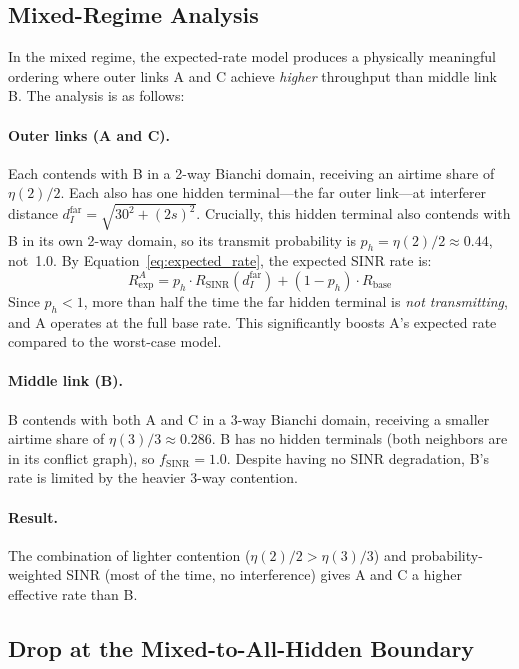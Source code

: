 \documentclass[11pt,a4paper]{article}
\begin{document}
\subsection{Mixed-Regime Analysis}

In the mixed regime, the expected-rate model produces a physically meaningful ordering where outer links A and C achieve \emph{higher} throughput than middle link B. The analysis is as follows:

\paragraph{Outer links (A and C).} Each contends with B in a 2-way Bianchi domain, receiving an airtime share of $\eta(2)/2$. Each also has one hidden terminal---the far outer link---at interferer distance $d_I^{\text{far}} = \sqrt{30^2 + (2s)^2}$. Crucially, this hidden terminal also contends with B in its own 2-way domain, so its transmit probability is $p_h = \eta(2)/2 \approx 0.44$, not~1.0. By Equation~\eqref{eq:expected_rate}, the expected SINR rate is:
\begin{equation}
    R_{\text{exp}}^{A} = p_h \cdot R_{\text{SINR}}(d_I^{\text{far}}) + (1 - p_h) \cdot R_{\text{base}}
\end{equation}
Since $p_h < 1$, more than half the time the far hidden terminal is \emph{not transmitting}, and A operates at the full base rate. This significantly boosts A's expected rate compared to the worst-case model.

\paragraph{Middle link (B).} B contends with both A and C in a 3-way Bianchi domain, receiving a smaller airtime share of $\eta(3)/3 \approx 0.286$. B has no hidden terminals (both neighbors are in its conflict graph), so $f_{\text{SINR}} = 1.0$. Despite having no SINR degradation, B's rate is limited by the heavier 3-way contention.

\paragraph{Result.} The combination of lighter contention ($\eta(2)/2 > \eta(3)/3$) and probability-weighted SINR (most of the time, no interference) gives A and C a higher effective rate than B.

\subsection{Drop at the Mixed-to-All-Hidden Boundary}
\end{document}
